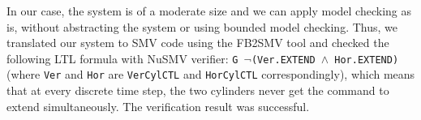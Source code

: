 \documentclass[conference]{IEEEtran}
\begin{document}


In our case, the system is of a moderate size and we can apply model checking as is, without abstracting the system or using bounded model checking.
Thus, we translated our system to SMV code using the FB2SMV tool and checked the following LTL formula with NuSMV verifier: \texttt{G $\neg$(Ver.EXTEND $\land$ Hor.EXTEND)} (where \texttt{Ver} and \texttt{Hor} are \texttt{VerCylCTL} and \texttt{HorCylCTL} correspondingly), 
which means that at every discrete time step, the two cylinders never get the command to extend simultaneously. The verification result was successful. 
\end{document}
